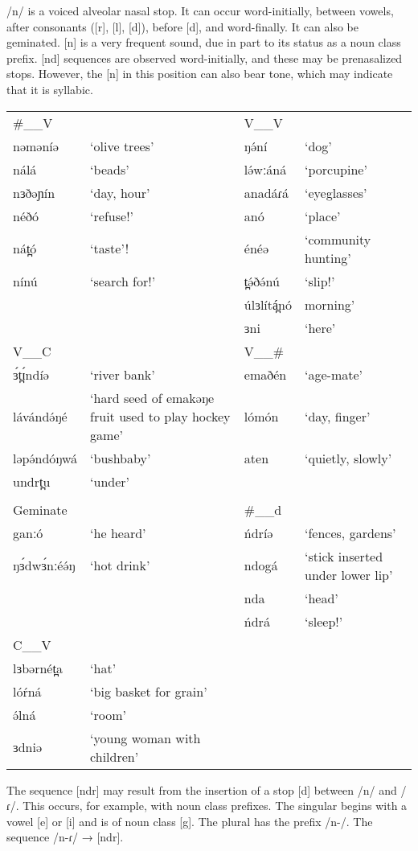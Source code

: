 /n/ is a voiced alveolar nasal stop. It can occur word-initially, between vowels, after consonants ([r], [l], [d]), before [d], and word-finally. It can also be geminated. [n] is a very frequent sound, due in part to its status as a noun class prefix. [nd] sequences are observed word-initially, and these may be prenasalized stops. However, the [n] in this position can also bear tone, which may indicate that it is syllabic.
\ea
\begin{tabular}[t]{lp{3.5cm}lp{3.5cm}}
\#\_\_V	&&	V\_\_V		\\
nəməníə	&‘olive trees’		&ŋə́ní	&‘dog’\\
nálá	&‘beads’		&lə́wːáná	&‘porcupine’\\
nɜðəɲín	&‘day, hour’	&	anadáɾá	&‘eyeglasses’\\
néðó	&‘refuse!’		&anó		&‘place’\\
nát̪ó	&‘taste’!		&énéə	&‘community hunting’\\
nínú	&‘search for!’	&	t̪ə́ðə́nú	&‘slip!’\\
						&&úlɜlítá̪nó	&morning’\\
						&&ɜni	&‘here’\\
\midrule				
V\_\_C	&&		V\_\_\# 	\\
\midrule
ɜ́t̪ɪ́ndíə	&‘river bank’	&	emaðén	&‘age-mate’\\
lávándə́ŋé	&‘hard seed of emakəŋe fruit used to play hockey game’	&	lómón	&‘day, finger’\\
ləpə́ndóŋwá	&‘bushbaby’		&aten	&‘quietly, slowly’\\
undrt̪u	&‘under’			\\
&\\		
Geminate	&&		\#\_\_d	\\
ganːó		&‘he heard’ 		&ńdríə	&‘fences, gardens’\\
ŋɜ́dwɜ́nːéə́ŋ	&‘hot drink’		&ndogá	&‘stick inserted under lower lip’\\
							&&nda	&‘head’\\
							&&ńdrá	&‘sleep!’\\
\midrule
C\_\_V\\
\midrule
lɜbərnét̪a	&‘hat’			\\
lóŕná		&‘big basket for grain’			\\
ə́lná			&‘room’			\\
ɜdniə		&‘young woman with children’	
\end{tabular}\label{ex:ch2:32}		
\z 

The sequence [ndr] may result from the insertion of a stop [d] between /n/ and /ɾ/. This occurs, for example, with noun class prefixes. The singular begins with a vowel [e] or [i] and is of noun class [g]. The plural has the prefix /n-/. The sequence /n-ɾ/ → [ndr]. 

